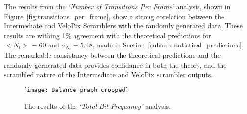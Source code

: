 			
			The results from the \textit{`Number of Transitions Per Frame'} analysis, shown in Figure~\ref{fig:transitions_per_frame}, show a strong corelation between the Intermediate and VeloPix Scramblers with the randomly generated data. 
			These results are withing 1\% agreement with the theoretical predictions for $<N_t> = 60$ and $\sigma_{N_t} = 5.48$, made in Section~\ref{subsub:statistical_predictions}. 
			The remarkable consistancy between the theoretical predictions and the randomly gernerated data provides confidance in both the theory, and the scrambled nature of the Intermediate and VeloPix scrambler outputs.



			\begin{figure}
				\centering
				\texttt{[image: Balance\_graph\_cropped]}
				\caption{The results of the \textit{`Total Bit Frequancy'} analysis.}
				\label{fig:bit_asym}
			\end{figure}

